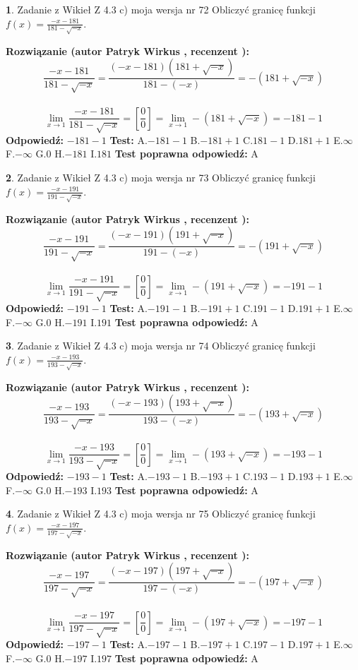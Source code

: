\documentclass[12pt, a4paper]{article}
\theoremstyle{definition} %
\newtheorem{zad}{}
\newcommand{\zadStart}[1]{\begin{zad}#1\newline}
\newcommand{\zadStop}{\end{zad}}
\newcommand{\rozwStart}[2]{\noindent \textbf{Rozwiązanie (autor #1 , recenzent #2): }\newline}
\newcommand{\rozwStop}{\newline}
\newcommand{\odpStart}{\noindent \textbf{Odpowiedź:}\newline}
\newcommand{\odpStop}{\newline}
\newcommand{\testStart}{\noindent \textbf{Test:}\newline}
\newcommand{\testStop}{\newline}
\newcommand{\kluczStart}{\noindent \textbf{Test poprawna odpowiedź:}\newline}
\newcommand{\kluczStop}{\newline}
\begin{document}
\zadStart{Zadanie z Wikieł Z 4.3 c) moja wersja nr 72}
Obliczyć granicę funkcji $f(x)=\frac{-x-181}{181-\sqrt{-x}}$.
\zadStop
\rozwStart{Patryk Wirkus}{}
$$\frac{-x-181}{181-\sqrt{-x}}=\frac{(-x-181)(181+\sqrt{-x})}{181-(-x)}=-(181+\sqrt{-x})$$
\\
$$\lim\limits_{x\to1}\frac{-x-181}{181-\sqrt{-x}}=[\frac{0}{0}]=\lim\limits_{x\to1}-(181+\sqrt{-x}) =-181-1$$
\rozwStop
\odpStart
$-181-1$
\odpStop
\testStart
A.$-181-1$
B.$-181+1$
C.$181-1$
D.$181+1$
E.$\infty$
F.$-\infty$
G.$0$
H.$-181$
I.$181$
\testStop
\kluczStart
A
\kluczStop



\zadStart{Zadanie z Wikieł Z 4.3 c) moja wersja nr 73}
Obliczyć granicę funkcji $f(x)=\frac{-x-191}{191-\sqrt{-x}}$.
\zadStop
\rozwStart{Patryk Wirkus}{}
$$\frac{-x-191}{191-\sqrt{-x}}=\frac{(-x-191)(191+\sqrt{-x})}{191-(-x)}=-(191+\sqrt{-x})$$
\\
$$\lim\limits_{x\to1}\frac{-x-191}{191-\sqrt{-x}}=[\frac{0}{0}]=\lim\limits_{x\to1}-(191+\sqrt{-x}) =-191-1$$
\rozwStop
\odpStart
$-191-1$
\odpStop
\testStart
A.$-191-1$
B.$-191+1$
C.$191-1$
D.$191+1$
E.$\infty$
F.$-\infty$
G.$0$
H.$-191$
I.$191$
\testStop
\kluczStart
A
\kluczStop



\zadStart{Zadanie z Wikieł Z 4.3 c) moja wersja nr 74}
Obliczyć granicę funkcji $f(x)=\frac{-x-193}{193-\sqrt{-x}}$.
\zadStop
\rozwStart{Patryk Wirkus}{}
$$\frac{-x-193}{193-\sqrt{-x}}=\frac{(-x-193)(193+\sqrt{-x})}{193-(-x)}=-(193+\sqrt{-x})$$
\\
$$\lim\limits_{x\to1}\frac{-x-193}{193-\sqrt{-x}}=[\frac{0}{0}]=\lim\limits_{x\to1}-(193+\sqrt{-x}) =-193-1$$
\rozwStop
\odpStart
$-193-1$
\odpStop
\testStart
A.$-193-1$
B.$-193+1$
C.$193-1$
D.$193+1$
E.$\infty$
F.$-\infty$
G.$0$
H.$-193$
I.$193$
\testStop
\kluczStart
A
\kluczStop



\zadStart{Zadanie z Wikieł Z 4.3 c) moja wersja nr 75}
Obliczyć granicę funkcji $f(x)=\frac{-x-197}{197-\sqrt{-x}}$.
\zadStop
\rozwStart{Patryk Wirkus}{}
$$\frac{-x-197}{197-\sqrt{-x}}=\frac{(-x-197)(197+\sqrt{-x})}{197-(-x)}=-(197+\sqrt{-x})$$
\\
$$\lim\limits_{x\to1}\frac{-x-197}{197-\sqrt{-x}}=[\frac{0}{0}]=\lim\limits_{x\to1}-(197+\sqrt{-x}) =-197-1$$
\rozwStop
\odpStart
$-197-1$
\odpStop
\testStart
A.$-197-1$
B.$-197+1$
C.$197-1$
D.$197+1$
E.$\infty$
F.$-\infty$
G.$0$
H.$-197$
I.$197$
\testStop
\kluczStart
A
\kluczStop
\end{document}
